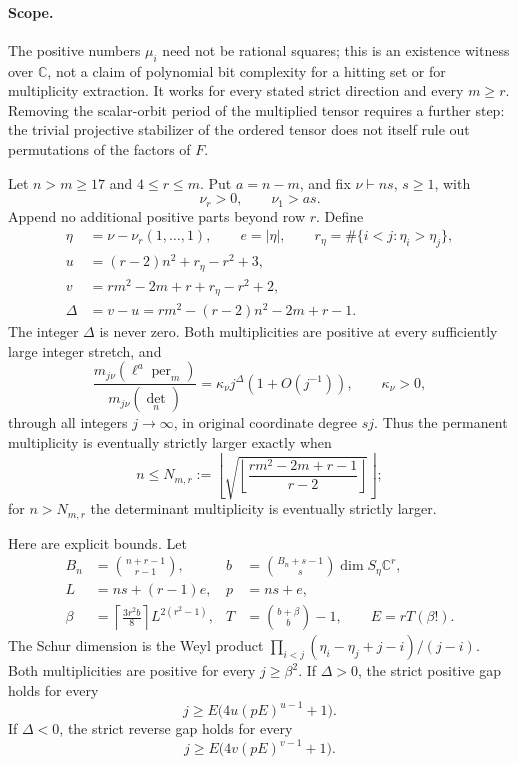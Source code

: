 \paragraph{Scope.}
The positive numbers $\mu_i$ need not be rational squares;
this is an existence witness over $\mathbb C$, not a claim
of polynomial bit complexity for a hitting set or for
multiplicity extraction. It works for every stated strict
direction and every $m\ge r$. Removing the scalar-orbit
period of the multiplied tensor requires a further step:
the trivial projective stabilizer of the ordered tensor
does not itself rule out permutations of the factors of $F$.



\begin{theorem}\label{G-23}
Let $n>m\ge17$ and $4\le r\le m$. Put $a=n-m$, and fix
$\nu\vdash ns$, $s\ge1$, with
\[
 \nu_r>0,\qquad \nu_1>as.
\]
Append no additional positive parts beyond row $r$.
Define
\[
 \begin{split}
 \eta&=\nu-\nu_r(1,\ldots,1),\qquad e=|\eta|,\qquad
 r_\eta=\#\{i<j:\eta_i>\eta_j\},\\
 u&=(r-2)n^2+r_\eta-r^2+3,\\
 v&=rm^2-2m+r+r_\eta-r^2+2,\\
 \Delta&=v-u=rm^2-(r-2)n^2-2m+r-1.
 \end{split}
\]
The integer $\Delta$ is never zero. Both multiplicities are
positive at every sufficiently large integer stretch, and
\begin{equation}\label{G23:ratio}
 \frac{m_{j\nu}(\ell^a\operatorname{per}_m)}
      {m_{j\nu}(\det_n)}
 =\kappa_\nu j^\Delta(1+O(j^{-1})),\qquad \kappa_\nu>0,
\end{equation}
through all integers $j\to\infty$, in original coordinate degree $sj$.
Thus the permanent multiplicity is eventually strictly larger
exactly when
\begin{equation}\label{G23:boundary}
 n\le N_{m,r}:=
 \left\lfloor\sqrt{\left\lfloor
       \frac{rm^2-2m+r-1}{r-2}\right\rfloor}\right\rfloor;
\end{equation}
for $n>N_{m,r}$ the determinant multiplicity is eventually strictly larger.

Here are explicit bounds. Let
\[
 \begin{aligned}
 B_n&=\binom{n+r-1}{r-1},&
 b&=\binom{B_n+s-1}{s}\dim S_\eta\mathbb C^r,\\
 L&=ns+(r-1)e,&p&=ns+e,\\
 \beta&=\left\lceil\frac{3r^2b}{8}\right\rceil
                          L^{2(r^2-1)},&
 T&=\binom{b+\beta}{b}-1,\qquad E=rT(\beta!).
 \end{aligned}
\]
The Schur dimension is the Weyl product
$\prod_{i<j}(\eta_i-\eta_j+j-i)/(j-i)$.
Both multiplicities are positive for every $j\ge\beta^2$.
If $\Delta>0$, the strict positive gap holds for every
\[
 j\ge E\bigl(4u(pE)^{u-1}+1\bigr).
\]
If $\Delta<0$, the strict reverse gap holds for every
\[
 j\ge E\bigl(4v(pE)^{v-1}+1\bigr).
\]
\end{theorem}

